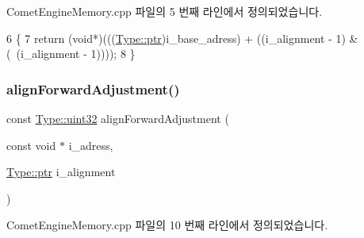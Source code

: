 Comet\+Engine\+Memory.\+cpp 파일의 5 번째 라인에서 정의되었습니다.


\begin{DoxyCode}
6 \{
7     \textcolor{keywordflow}{return} (\textcolor{keywordtype}{void}*)(((\hyperlink{namespace_comet_engine_1_1_type_aeb22ad46de677e9a50679dfebeb0e6f0}{Type::ptr})i\_base\_adress) + ((i\_alignment - 1) & (~(i\_alignment - 1))));
8 \}
\end{DoxyCode}
\mbox{\label{namespace_comet_engine_1_1_core_1_1_memory_1_1_utils_aa5a0140d498d631a747be87791063f2d}} 
\subsubsection{\texorpdfstring{align\+Forward\+Adjustment()}{alignForwardAdjustment()}}
{\footnotesize\ttfamily const \hyperlink{namespace_comet_engine_1_1_type_ada4c95a4173a4bb540c8a7f80f3665d2}{Type\+::uint32} align\+Forward\+Adjustment (\begin{DoxyParamCaption}\item[{const void $\ast$}]{i\+\_\+adress,  }\item[{\hyperlink{namespace_comet_engine_1_1_type_aeb22ad46de677e9a50679dfebeb0e6f0}{Type\+::ptr}}]{i\+\_\+alignment }\end{DoxyParamCaption})}



Comet\+Engine\+Memory.\+cpp 파일의 10 번째 라인에서 정의되었습니다.


